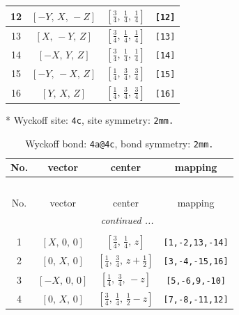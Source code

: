 \documentclass[fleqn,8pt]{jsarticle}
\begin{document}
\begin{longtable}{cccc}
12 & $\left[ - Y,\, X,\, - Z \right]$ & $\left[ \frac{3}{4},\, \frac{1}{4},\, \frac{1}{4} \right]$ & {\tt [12]} \\ \hline
13 & $\left[ X,\, - Y,\, Z \right]$ & $\left[ \frac{3}{4},\, \frac{1}{4},\, \frac{1}{4} \right]$ & {\tt [13]} \\ \hline
14 & $\left[ - X,\, Y,\, Z \right]$ & $\left[ \frac{3}{4},\, \frac{1}{4},\, \frac{1}{4} \right]$ & {\tt [14]} \\ \hline
15 & $\left[ - Y,\, - X,\, Z \right]$ & $\left[ \frac{1}{4},\, \frac{3}{4},\, \frac{3}{4} \right]$ & {\tt [15]} \\ \hline
16 & $\left[ Y,\, X,\, Z \right]$ & $\left[ \frac{1}{4},\, \frac{3}{4},\, \frac{3}{4} \right]$ & {\tt [16]} \\
\end{longtable}
* Wyckoff site: {\tt 4c}, site symmetry: {\tt 2mm.}
\renewcommand{\arraystretch}{1.2}
\begin{longtable}{cccc}
\caption{Wyckoff bond: {\tt 4a@4c}, bond symmetry: {\tt 2mm.}}
 \\
 \hline \hline
No. & vector & center & mapping \\ \hline \endfirsthead

\multicolumn{3}{l}{\tablename\ \thetable{}} \\
 \hline \hline
No. & vector & center & mapping \\ \hline \endhead

 \hline \hline
\multicolumn{3}{r}{\footnotesize\it continued ...} \\ \endfoot

 \hline \hline
\multicolumn{3}{r}{} \\ \endlastfoot

1 & $\left[ X,\, 0,\, 0 \right]$ & $\left[ \frac{3}{4},\, \frac{1}{4},\, z \right]$ & {\tt [1,-2,13,-14]} \\ \hline
2 & $\left[ 0,\, X,\, 0 \right]$ & $\left[ \frac{1}{4},\, \frac{3}{4},\, z + \frac{1}{2} \right]$ & {\tt [3,-4,-15,16]} \\ \hline
3 & $\left[ - X,\, 0,\, 0 \right]$ & $\left[ \frac{1}{4},\, \frac{3}{4},\, - z \right]$ & {\tt [5,-6,9,-10]} \\ \hline
4 & $\left[ 0,\, X,\, 0 \right]$ & $\left[ \frac{3}{4},\, \frac{1}{4},\, \frac{1}{2} - z \right]$ & {\tt [7,-8,-11,12]} \\
\end{longtable}
\renewcommand{\arraystretch}{1.2}
\end{document}
